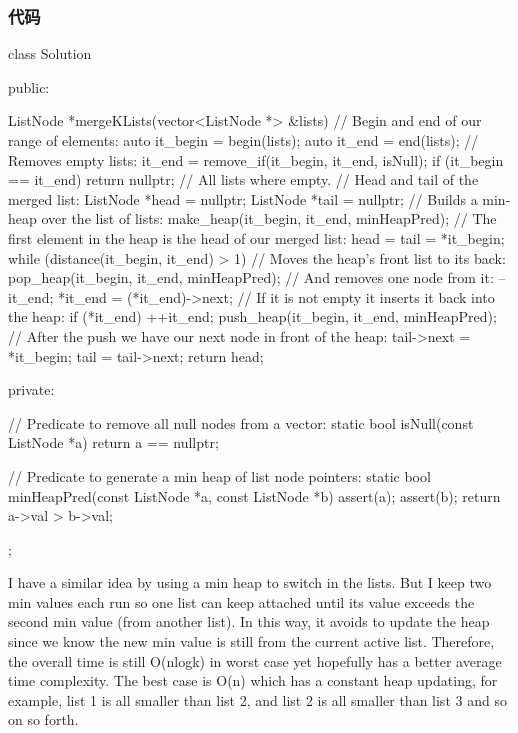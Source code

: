 \subsubsection{代码}
\begin{Code}
class Solution {

public:

    ListNode *mergeKLists(vector<ListNode *> &lists) {
        // Begin and end of our range of elements:
        auto it_begin = begin(lists);
        auto it_end = end(lists);
        // Removes empty lists:
        it_end = remove_if(it_begin, it_end, isNull);
        if (it_begin == it_end) return nullptr; // All lists where empty.
        // Head and tail of the merged list:
        ListNode *head = nullptr;
        ListNode *tail = nullptr;
        // Builds a min-heap over the list of lists:
        make_heap(it_begin, it_end, minHeapPred);
        // The first element in the heap is the head of our merged list:
        head = tail = *it_begin;
        while (distance(it_begin, it_end) > 1) {
            // Moves the heap's front list to its back:
            pop_heap(it_begin, it_end, minHeapPred);
            // And removes one node from it:
            --it_end;
            *it_end = (*it_end)->next;
            // If it is not empty it inserts it back into the heap:
            if (*it_end) {
                ++it_end;
                push_heap(it_begin, it_end, minHeapPred);
            }
            // After  the push we have our next node in front of the heap:
            tail->next = *it_begin;
            tail = tail->next;
        }
        return head;
    }

private:

    // Predicate to remove all null nodes from a vector:
    static bool isNull(const ListNode *a) {
        return a == nullptr;
    }

    // Predicate to generate a min heap of list node pointers:
    static bool minHeapPred(const ListNode *a,
                            const ListNode *b) {
        assert(a);
        assert(b);
        return a->val > b->val;
    }

};
\end{Code}

I have a similar idea by using a min heap to switch in the lists. But I keep two min values each run so one list can keep attached until its value exceeds the second min value (from another list). In this way, it avoids to update the heap since we know the new min value is still from the current active list. Therefore, the overall time is still O(nlogk) in worst case yet hopefully has a better average time complexity. The best case is O(n) which has a constant heap updating, for example, list 1 is all smaller than list 2, and list 2 is all smaller than list 3 and so on so forth.


